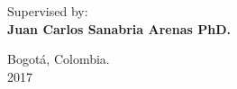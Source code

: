 \begin{center}
\large {Supervised by:}\\
\textbf{Juan Carlos Sanabria Arenas PhD.}
\end{center}

\vspace{1.5em}
\begin{center}
Bogotá, Colombia.\\
2017
\end{center}













